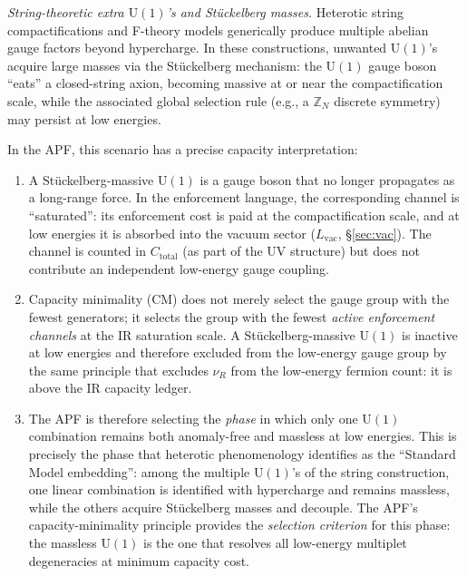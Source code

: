 \documentclass[11pt,a4paper]{article}
\theoremstyle{definition}
\newcommand{\U}{\mathrm{U}}
\begin{document}
\smallskip\noindent\textit{String-theoretic extra $\U(1)$'s and
St\"uckelberg masses.}\quad
Heterotic string compactifications and F-theory models generically
produce multiple abelian gauge factors beyond hypercharge.  In these
constructions, unwanted $\U(1)$'s acquire large masses via the
St\"uckelberg mechanism: the $\U(1)$ gauge boson ``eats'' a closed-string
axion, becoming massive at or near the compactification scale, while
the associated global selection rule (e.g., a $\mathbb{Z}_N$ discrete
symmetry) may persist at low energies.

In the APF, this scenario has a precise capacity interpretation:
\begin{enumerate}[label=(\alph*),nosep]
  \item A St\"uckelberg-massive $\U(1)$ is a gauge boson that no longer
  propagates as a long-range force.  In the enforcement language, the
  corresponding channel is ``saturated'': its enforcement cost is paid
  at the compactification scale, and at low energies it is absorbed into
  the vacuum sector ($L_{\mathrm{vac}}$, \S\ref{sec:vac}).
  The channel is counted in $C_{\mathrm{total}}$ (as part of the UV
  structure) but does not contribute an independent low-energy gauge
  coupling.
  \item Capacity minimality (CM) does not merely select the gauge group
  with the fewest generators; it selects the group with the fewest
  \emph{active enforcement channels} at the IR saturation scale.
  A St\"uckelberg-massive $\U(1)$ is inactive at low energies and
  therefore excluded from the low-energy gauge group by the same
  principle that excludes $\nu_R$ from the low-energy fermion count:
  it is above the IR capacity ledger.
  \item The APF is therefore selecting the \emph{phase} in which only
  one $\U(1)$ combination remains both anomaly-free and massless at
  low energies.  This is precisely the phase that heterotic
  phenomenology identifies as the ``Standard Model embedding'': among
  the multiple $\U(1)$'s of the string construction, one linear
  combination is identified with hypercharge and remains massless, while
  the others acquire St\"uckelberg masses and decouple.  The APF's
  capacity-minimality principle provides the \emph{selection criterion}
  for this phase: the massless $\U(1)$ is the one that resolves all
  low-energy multiplet degeneracies at minimum capacity cost.
\end{enumerate}
\end{document}
